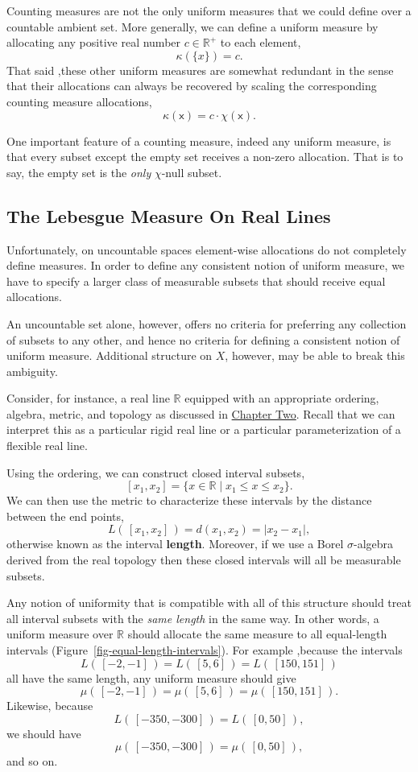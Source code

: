 \documentclass[
  letterpaper,
  DIV=11,
  numbers=noendperiod]{scrartcl}
\begin{document}
Counting measures are not the only uniform measures that we could define
over a countable ambient set. More generally, we can define a uniform
measure by allocating any positive real number \(c \in \mathbb{R}^{+}\)
to each element, \[
\kappa(\{ x \}) = c.
\] That said ,these other uniform measures are somewhat redundant in the
sense that their allocations can always be recovered by scaling the
corresponding counting measure allocations, \[
\kappa ( \mathsf{x} ) = c \cdot \chi ( \mathsf{x} ).
\]

One important feature of a counting measure, indeed any uniform measure,
is that every subset except the empty set receives a non-zero
allocation. That is to say, the empty set is the \emph{only}
\(\chi\)-null subset.

\subsection{The Lebesgue Measure On Real Lines}\label{sec:lebesgue}

Unfortunately, on uncountable spaces element-wise allocations do not
completely define measures. In order to define any consistent notion of
uniform measure, we have to specify a larger class of measurable subsets
that should receive equal allocations.

An uncountable set alone, however, offers no criteria for preferring any
collection of subsets to any other, and hence no criteria for defining a
consistent notion of uniform measure. Additional structure on \(X\),
however, may be able to break this ambiguity.

Consider, for instance, a real line \(\mathbb{R}\) equipped with an
appropriate ordering, algebra, metric, and topology as discussed in
\href{http://www.symplectomorphic.com/assets/chapters_html/spaces.html}{Chapter
Two}. Recall that we can interpret this as a particular rigid real line
or a particular parameterization of a flexible real line.

Using the ordering, we can construct closed interval subsets, \[
[ x_{1}, x_{2} ]
=
\{ x \in \mathbb{R} \mid x_{1} \le x \le x_{2} \}.
\] We can then use the metric to characterize these intervals by the
distance between the end points, \[
L( \, [ x_{1}, x_{2} ] \, )
=
d( x_{1}, x_{2} ) = | x_{2} - x_{1} |,
\] otherwise known as the interval \textbf{length}. Moreover, if we use
a Borel \(\sigma\)-algebra derived from the real topology then these
closed intervals will all be measurable subsets.

Any notion of uniformity that is compatible with all of this structure
should treat all interval subsets with the \emph{same length} in the
same way. In other words, a uniform measure over \(\mathbb{R}\) should
allocate the same measure to all equal-length intervals
(Figure~\ref{fig-equal-length-intervals}). For example ,because the
intervals \[
L( \, [-2, -1] \, ) = L( \, [5, 6] \, ) = L( \, [150, 151] \,)
\] all have the same length, any uniform measure should give \[
\mu( \, [-2, -1] \, )
=
\mu( \, [5, 6] \, )
=
\mu( \, [150, 151] \, ).
\] Likewise, because \[
L( \, [-350, -300] \, ) = L( \, [0, 50] \, ),
\] we should have \[
\mu( \, [-350, -300] \, ) = \mu( \, [0, 50] \,),
\] and so on.
\end{document}
